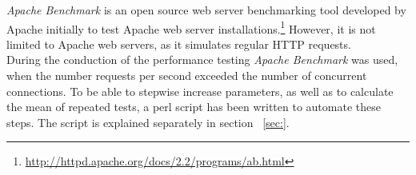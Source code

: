 \emph{Apache Benchmark} is an open source web server benchmarking tool developed by Apache initially to test Apache web server installations.\footnote{\url{http://httpd.apache.org/docs/2.2/programs/ab.html}} However, it is not limited to Apache web servers, as it simulates regular HTTP requests.\\
During the conduction of the performance testing \emph{Apache Benchmark} was used, when the number requests per second exceeded the number of concurrent connections. To be able to stepwise increase parameters, as well as to calculate the mean of repeated tests, a perl script has been written to automate these steps. The script is explained separately in section {\color{red}{(PLEASE ADD REFERENCE)}}~\ref{sec:}. 
